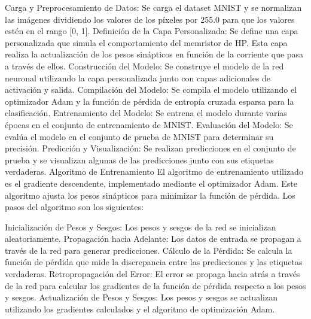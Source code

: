 \documentclass[conference]{IEEEtran}
\begin{document}
Carga y Preprocesamiento de Datos: Se carga el dataset MNIST y se normalizan las imágenes dividiendo los valores de los píxeles por 255.0 para que los valores estén en el rango [0, 1].
Definición de la Capa Personalizada: Se define una capa personalizada que simula el comportamiento del memristor de HP. Esta capa realiza la actualización de los pesos sinápticos en función de la corriente que pasa a través de ellos.
Construcción del Modelo: Se construye el modelo de la red neuronal utilizando la capa personalizada junto con capas adicionales de activación y salida.
Compilación del Modelo: Se compila el modelo utilizando el optimizador Adam y la función de pérdida de entropía cruzada esparsa para la clasificación.
Entrenamiento del Modelo: Se entrena el modelo durante varias épocas en el conjunto de entrenamiento de MNIST.
Evaluación del Modelo: Se evalúa el modelo en el conjunto de prueba de MNIST para determinar su precisión.
Predicción y Visualización: Se realizan predicciones en el conjunto de prueba y se visualizan algunas de las predicciones junto con sus etiquetas verdaderas.
Algoritmo de Entrenamiento
El algoritmo de entrenamiento utilizado es el gradiente descendente, implementado mediante el optimizador Adam. Este algoritmo ajusta los pesos sinápticos para minimizar la función de pérdida. Los pasos del algoritmo son los siguientes:

Inicialización de Pesos y Sesgos: Los pesos y sesgos de la red se inicializan aleatoriamente.
Propagación hacia Adelante: Los datos de entrada se propagan a través de la red para generar predicciones.
Cálculo de la Pérdida: Se calcula la función de pérdida que mide la discrepancia entre las predicciones y las etiquetas verdaderas.
Retropropagación del Error: El error se propaga hacia atrás a través de la red para calcular los gradientes de la función de pérdida respecto a los pesos y sesgos.
Actualización de Pesos y Sesgos: Los pesos y sesgos se actualizan utilizando los gradientes calculados y el algoritmo de optimización Adam.
\end{document}
